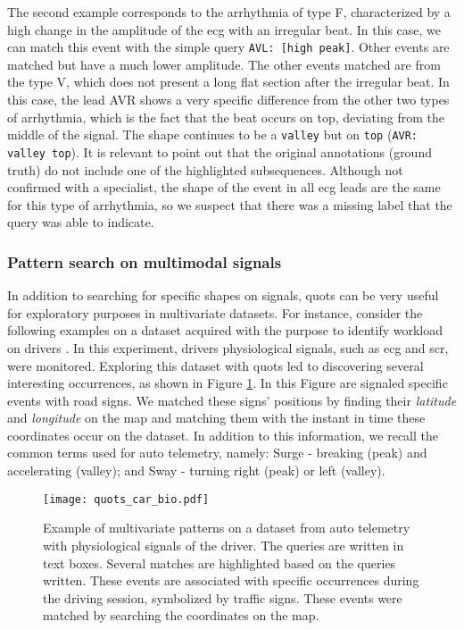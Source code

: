 The second example corresponds to the arrhythmia of type F, characterized by a high change in the amplitude of the \gls{ecg} with an irregular beat. In this case, we can match this event with the simple query \texttt{AVL: [high peak]}. Other events are matched but have a much lower amplitude. The other events matched are from the type V, which does not present a long flat section after the irregular beat. In this case, the lead AVR shows a very specific difference from the other two types of arrhythmia, which is the fact that the beat occurs on top, deviating from the middle of the signal. The shape continues to be a \texttt{valley} but on \texttt{top} (\texttt{AVR: valley top}). It is relevant to point out that the original annotations (ground truth) do not include one of the highlighted subsequences. Although not confirmed with a specialist, the shape of the event in all \gls{ecg} leads are the same for this type of arrhythmia, so we suspect that there was a missing label that the query was able to indicate.

\subsubsection{Pattern search on multimodal signals}

In addition to searching for specific shapes on signals, \gls{quots} can be very useful for exploratory purposes in multivariate datasets. For instance, consider the following examples on a dataset acquired with the purpose to identify workload on drivers \cite{hcilab}. In this experiment, drivers physiological signals, such as \gls{ecg} and \gls{scr}, were monitored. Exploring this dataset with \gls{quots} led to discovering several interesting occurrences, as shown in Figure \ref{fig:quots_car_physio}. In this Figure are signaled specific events with road signs. We matched these signs' positions by finding their \textit{latitude} and \textit{longitude} on the map and matching them with the instant in time these coordinates occur on the dataset. In addition to this information, we recall the common terms used for auto telemetry, namely: Surge - breaking (peak) and accelerating (valley); and Sway - turning right (peak) or left (valley).

\begin{figure}[h]
\centering
\texttt{[image: quots\_car\_bio.pdf]}
\caption{Example of multivariate patterns on a dataset from auto telemetry with physiological signals of the driver. The queries are written in text boxes. Several matches are highlighted based on the queries written. These events are associated with specific occurrences during the driving session, symbolized by traffic signs. These events were matched by searching the coordinates on the map. \cite{hcilab}}
\label{fig:quots_car_physio}
\end{figure}

